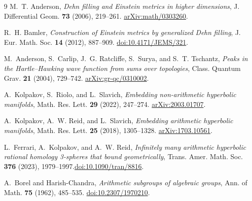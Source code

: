 \documentclass[11pt]{article}
\theoremstyle{remark}
\begin{document}
\begin{thebibliography}{9}
M.~T. Anderson,
\emph{Dehn filling and Einstein metrics in higher dimensions},
J. Differential Geom. \textbf{73} (2006), 219--261.
\href{https://arxiv.org/abs/math/0303260}{arXiv:math/0303260}.

R.~H. Bamler,
\emph{Construction of Einstein metrics by generalized Dehn filling},
J. Eur. Math. Soc. \textbf{14} (2012), 887--909.
\href{https://doi.org/10.4171/JEMS/321}{doi:10.4171/JEMS/321}.

M.~Anderson, S.~Carlip, J.~G. Ratcliffe, S.~Surya, and S.~T. Tschantz,
\emph{Peaks in the Hartle--Hawking wave function from sums over topologies},
Class. Quantum Grav. \textbf{21} (2004), 729--742.
\href{https://arxiv.org/abs/gr-qc/0310002}{arXiv:gr-qc/0310002}.

A.~Kolpakov, S.~Riolo, and L.~Slavich,
\emph{Embedding non-arithmetic hyperbolic manifolds},
Math. Res. Lett. \textbf{29} (2022), 247--274.
\href{https://arxiv.org/abs/2003.01707}{arXiv:2003.01707}.

A.~Kolpakov, A.~W. Reid, and L.~Slavich,
\emph{Embedding arithmetic hyperbolic manifolds},
Math. Res. Lett. \textbf{25} (2018), 1305--1328.
\href{https://arxiv.org/abs/1703.10561}{arXiv:1703.10561}.

L.~Ferrari, A.~Kolpakov, and A.~W. Reid,
\emph{Infinitely many arithmetic hyperbolic rational homology 3-spheres that bound geometrically},
Trans. Amer. Math. Soc. \textbf{376} (2023), 1979--1997.\newline\href{https://doi.org/10.1090/tran/8816}{doi:10.1090/tran/8816}.

A.~Borel and Harish-Chandra,
\emph{Arithmetic subgroups of algebraic groups},
Ann. of Math. \textbf{75} (1962), 485--535.
\href{https://doi.org/10.2307/1970210}{doi:10.2307/1970210}.
\end{thebibliography}
\end{document}
